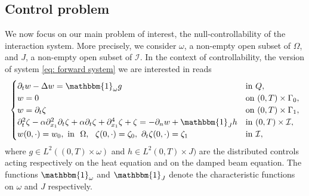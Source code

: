 \documentclass[a4paper, 12pt]{article}
\theoremstyle{plain}
\theoremstyle{definition}
\numberwithin{theorem}{section}
\numberwithin{equation}{section}
\begin{document}

\subsection{Control problem}

We now focus on our main problem of interest, the null-controllability of the interaction system. More precisely, we consider $\omega$, a non-empty open subset of $\Omega$, and $J$, a non-empty open subset of $\mathcal I$. In the context of controllability, the version of system \eqref{eq: forward system}
we are interested in reads 
\begin{align}\label{eq: parabolic}
\begin{cases}
\partial_t w -\Delta w =\mathbbm{1}_{\omega} g&\text{in}~Q,\\
w=0 &\text{on}~(0,T) \times\Gamma_0,\\
w=\partial_t\zeta  &\text{on}~(0,T) \times\Gamma_1,\\
\partial^2_{t}\zeta-\alpha\partial^2_{x_1}\partial_t\zeta+\alpha\partial_t\zeta+\partial^4_{x_1}\zeta+\zeta=-\partial_nw+\mathbbm{1}_{J} h & \text{in}~(0,T) \times\mathcal{I},\\
w(0,\cdot)=w_0,~\text{in}~~\Omega,~~ \zeta(0,\cdot)=\zeta_0,~ \partial_t\zeta(0,\cdot)=\zeta_1 &\text{in}~\mathcal{I},
\end{cases}
\end{align}
where $g \in L^2((0,T)\times \omega)$ and $h \in L^2(0,T)\times J)$ are the distributed controls acting respectively on the heat equation and on the damped beam equation. The functions $\mathbbm{1}_{\omega}$ and $\mathbbm{1}_{J}$ denote the characteristic functions on $\omega$ and $J$ respectively.
\end{document}
